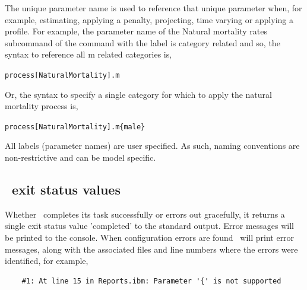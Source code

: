 The unique parameter name is used to reference that unique parameter when, for example, estimating, applying a penalty, projecting, time varying or applying a profile. For example, the parameter name of the Natural mortality rates subcommand  of the command  with the label  is category related and so, the syntax to reference all m related categories is, 

\texttt{process[NaturalMortality].m}

Or, the syntax to specify a single category for which to apply the natural mortality process is,

\texttt{process[NaturalMortality].m\{male\}}

All labels (parameter names) are user specified. As such, naming conventions are non-restrictive and can be model specific.

\subsection{\IBM\ exit status values}
Whether \IBM\ completes its task successfully or errors out gracefully, it returns a single exit status value 'completed' to the standard output. Error messages will be printed to the console. When configuration errors are found \IBM\ will print error messages, along with the associated files and line numbers where the errors were identified, for example,

{\small{\begin{verbatim}
	#1: At line 15 in Reports.ibm: Parameter '{' is not supported
\end{verbatim}}}	